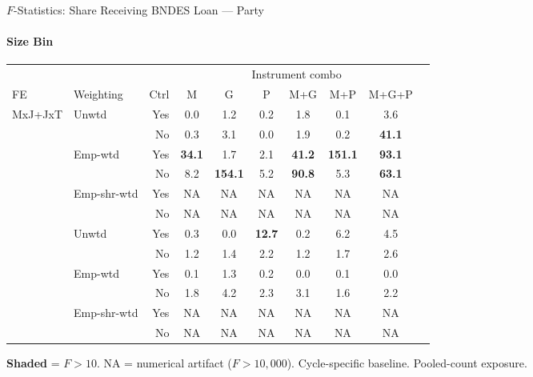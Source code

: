\documentclass[aspectratio=169,10pt]{beamer}
\newcommand{\fpass}[1]{\cellcolor{pass}\textbf{#1}}
\begin{document}
\begin{frame}[t]{$F$-Statistics: Share Receiving BNDES Loan --- Party}
\framesubtitle{Size Bin}
\begin{center}
\footnotesize
\setlength{\tabcolsep}{3.5pt}
\renewcommand{\arraystretch}{1.05}
\begin{tabular}{@{}llrccccccc@{}}
\toprule
 & & & \multicolumn{6}{c}{Instrument combo} \\
\cmidrule(l{2pt}r{2pt}){4-9}
FE & Weighting & Ctrl & M & G & P & M+G & M+P & M+G+P \\
\midrule
  \multirow{6}{*}{MxJ+JxT} & \multirow{2}{*}{Unwtd} & Yes & 0.0 & 1.2 & 0.2 & 1.8 & 0.1 & 3.6 \\
   &  & No & 0.3 & 3.1 & 0.0 & 1.9 & 0.2 & \fpass{41.1} \\
   & \multirow{2}{*}{Emp-wtd} & Yes & \fpass{34.1} & 1.7 & 2.1 & \fpass{41.2} & \fpass{151.1} & \fpass{93.1} \\
   &  & No & 8.2 & \fpass{154.1} & 5.2 & \fpass{90.8} & 5.3 & \fpass{63.1} \\
   & \multirow{2}{*}{Emp-shr-wtd} & Yes & NA & NA & NA & NA & NA & NA \\
   &  & No & NA & NA & NA & NA & NA & NA \\
\addlinespace[5pt]
  \multirow{6}{*}{MxJ+MxT} & \multirow{2}{*}{Unwtd} & Yes & 0.3 & 0.0 & \fpass{12.7} & 0.2 & 6.2 & 4.5 \\
   &  & No & 1.2 & 1.4 & 2.2 & 1.2 & 1.7 & 2.6 \\
   & \multirow{2}{*}{Emp-wtd} & Yes & 0.1 & 1.3 & 0.2 & 0.0 & 0.1 & 0.0 \\
   &  & No & 1.8 & 4.2 & 2.3 & 3.1 & 1.6 & 2.2 \\
   & \multirow{2}{*}{Emp-shr-wtd} & Yes & NA & NA & NA & NA & NA & NA \\
   &  & No & NA & NA & NA & NA & NA & NA \\
\bottomrule
\end{tabular}
\end{center}
{\scriptsize \colorbox{pass}{\textbf{Shaded}} = $F>10$. NA = numerical artifact ($F>10{,}000$). Cycle-specific baseline. Pooled-count exposure.}
\end{frame}
\end{document}
